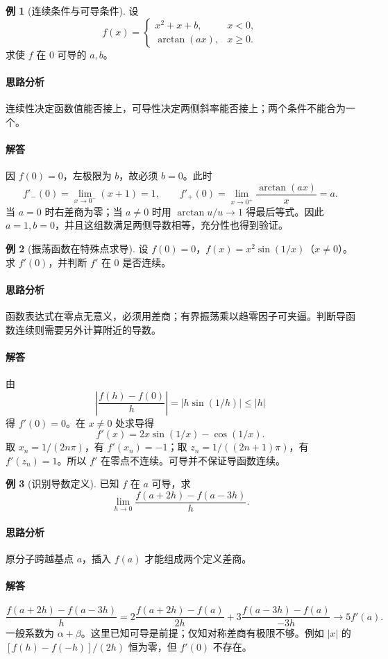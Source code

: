 \documentclass[UTF8,fontset=fandol,12pt,oneside,openany]{ctexrep}
\theoremstyle{definition}
\newtheorem{example}{例}[chapter]
\begin{document}
\begin{example}[连续条件与可导条件]
设
\[
 f(x)=\begin{cases}x^2+x+b,&x<0,\\ \arctan(ax),&x\ge0.\end{cases}
\]
求使 $f$ 在 $0$ 可导的 $a,b$。
\end{example}
\paragraph{思路分析}连续性决定函数值能否接上，可导性决定两侧斜率能否接上；两个条件不能合为一个。
\paragraph{解答}因 $f(0)=0$，左极限为 $b$，故必须 $b=0$。此时
\[
 f'_-(0)=\lim_{x\to0^-}(x+1)=1,
 \qquad f'_+(0)=\lim_{x\to0^+}\frac{\arctan(ax)}x=a.
\]
当 $a=0$ 时右差商为零；当 $a\ne0$ 时用 $\arctan u/u\to1$ 得最后等式。因此 $a=1,b=0$，并且这组数满足两侧导数相等，充分性也得到验证。

\begin{example}[振荡函数在特殊点求导]
设 $f(0)=0$，$f(x)=x^2\sin(1/x)$（$x\ne0$）。求 $f'(0)$，并判断 $f'$ 在 $0$ 是否连续。
\end{example}
\paragraph{思路分析}函数表达式在零点无意义，必须用差商；有界振荡乘以趋零因子可夹逼。判断导函数连续则需要另外计算附近的导数。
\paragraph{解答}由
\[
 \left|\frac{f(h)-f(0)}h\right|=|h\sin(1/h)|\le |h|
\]
得 $f'(0)=0$。在 $x\ne0$ 处求导得
\[
 f'(x)=2x\sin(1/x)-\cos(1/x).
\]
取 $x_n=1/(2n\pi)$，有 $f'(x_n)=-1$；取 $z_n=1/((2n+1)\pi)$，有 $f'(z_n)=1$。所以 $f'$ 在零点不连续。可导并不保证导函数连续。

\begin{example}[识别导数定义]
已知 $f$ 在 $a$ 可导，求
\[
 \lim_{h\to0}\frac{f(a+2h)-f(a-3h)}h.
\]
\end{example}
\paragraph{思路分析}原分子跨越基点 $a$，插入 $f(a)$ 才能组成两个定义差商。
\paragraph{解答}
\[
 \frac{f(a+2h)-f(a-3h)}h
 =2\frac{f(a+2h)-f(a)}{2h}
  +3\frac{f(a-3h)-f(a)}{-3h}\longrightarrow5f'(a).
\]
一般系数为 $\alpha+\beta$。这里已知可导是前提；仅知对称差商有极限不够。例如 $|x|$ 的 $[f(h)-f(-h)]/(2h)$ 恒为零，但 $f'(0)$ 不存在。
\end{document}
